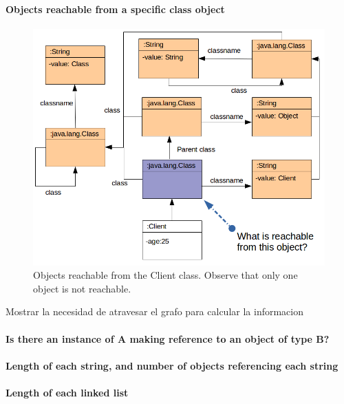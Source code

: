 
\paragraph{Objects reachable from a specific class object}

\begin{figure}[!ht]
\centering
\includegraphics[scale=0.5]{./chapter6/fig/example1.png}
\caption{Objects reachable from the Client class. Observe that only one object is not reachable.}\label{fig:reachable-from-class-object}
\end{figure}

Mostrar la necesidad de atravesar el grafo para calcular la informacion

\paragraph{Is there an instance of A making reference to an object of type B?}

\paragraph{Length of each string, and number of objects referencing each string}

\paragraph{Length of each linked list}


